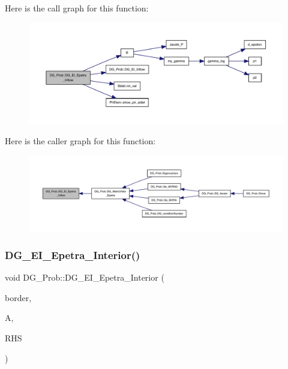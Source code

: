 Here is the call graph for this function\+:
\nopagebreak
\begin{figure}[H]
\begin{center}
\leavevmode
\includegraphics[width=350pt]{classDG__Prob_a0c085b8fc3c827c37aa8733a2842a97f_cgraph}
\end{center}
\end{figure}
Here is the caller graph for this function\+:
\nopagebreak
\begin{figure}[H]
\begin{center}
\leavevmode
\includegraphics[width=350pt]{classDG__Prob_a0c085b8fc3c827c37aa8733a2842a97f_icgraph}
\end{center}
\end{figure}
\mbox{\label{classDG__Prob_aa09b19ad56db0010779b0787d0edd2a5}} 
\subsubsection{\texorpdfstring{D\+G\+\_\+\+E\+I\+\_\+\+Epetra\+\_\+\+Interior()}{DG\_EI\_Epetra\_Interior()}}
{\footnotesize\ttfamily void D\+G\+\_\+\+Prob\+::\+D\+G\+\_\+\+E\+I\+\_\+\+Epetra\+\_\+\+Interior (\begin{DoxyParamCaption}\item[{const \hyperlink{structEDGE}{E\+D\+GE}}]{border,  }\item[{Teuchos\+::\+R\+CP$<$ Epetra\+\_\+\+F\+E\+Crs\+Matrix $>$}]{A,  }\item[{Teuchos\+::\+R\+CP$<$ Epetra\+\_\+\+F\+E\+Vector $>$}]{R\+HS }\end{DoxyParamCaption})}




